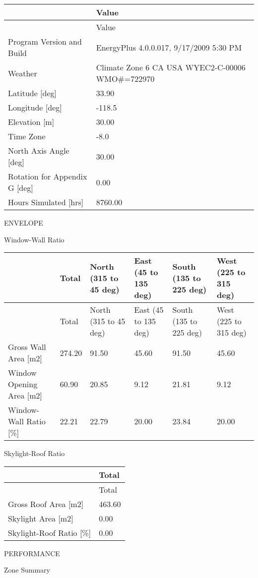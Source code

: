 \begin{longtable}[c]{p{2.25in}p{3.74in}}
\toprule 
~ & Value \tabularnewline
\midrule
\endfirsthead

\toprule 
~ & Value \tabularnewline
\midrule
\endhead

Program Version and Build & EnergyPlus 4.0.0.017, 9/17/2009 5:30 PM \tabularnewline
Weather & Climate Zone 6 CA USA WYEC2-C-00006 WMO\#=722970 \tabularnewline
Latitude [deg] & 33.90 \tabularnewline
Longitude [deg] & -118.5 \tabularnewline
Elevation [m] & 30.00 \tabularnewline
Time Zone & -8.0 \tabularnewline
North Axis Angle [deg] & 30.00 \tabularnewline
Rotation for Appendix G [deg] & 0.00 \tabularnewline
Hours Simulated [hrs] & 8760.00 \tabularnewline
\bottomrule
\end{longtable}

ENVELOPE

Window-Wall Ratio

\begin{longtable}[c]{p{1.0in}p{1.0in}p{1.0in}p{1.0in}p{1.0in}p{1.0in}}
\toprule 
~ & Total & North (315 to 45 deg) & East (45 to 135 deg) & South (135 to 225 deg) & West (225 to 315 deg) \tabularnewline
\midrule
\endfirsthead

\toprule 
~ & Total & North (315 to 45 deg) & East (45 to 135 deg) & South (135 to 225 deg) & West (225 to 315 deg) \tabularnewline
\midrule
\endhead

Gross Wall Area [m2] & 274.20 & 91.50 & 45.60 & 91.50 & 45.60 \tabularnewline
Window Opening Area [m2] & 60.90 & 20.85 & 9.12 & 21.81 & 9.12 \tabularnewline
Window-Wall Ratio [\%] & 22.21 & 22.79 & 20.00 & 23.84 & 20.00 \tabularnewline
\bottomrule
\end{longtable}

Skylight-Roof Ratio

\begin{longtable}[c]{@{}ll@{}}
\toprule 
~ & Total \tabularnewline
\midrule
\endfirsthead

\toprule 
~ & Total \tabularnewline
\midrule
\endhead

Gross Roof Area [m2] & 463.60 \tabularnewline
Skylight Area [m2] & 0.00 \tabularnewline
Skylight-Roof Ratio [\%] & 0.00 \tabularnewline
\bottomrule
\end{longtable}

PERFORMANCE

Zone Summary

